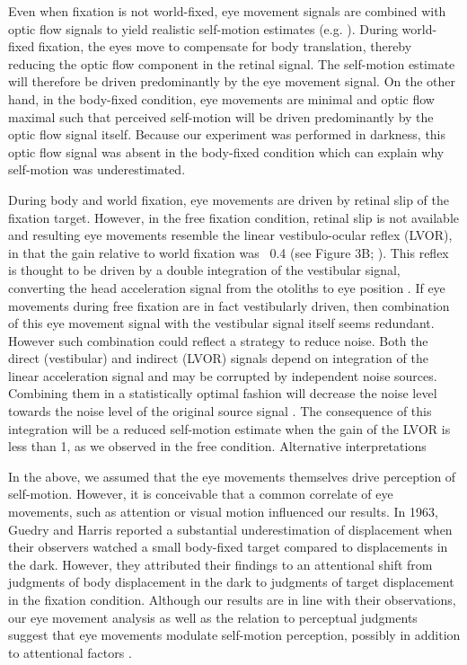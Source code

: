 Even when fixation is not world-fixed, eye movement signals are combined with optic flow signals to yield realistic self-motion estimates (e.g. \cite{royden1992,vandenberg2000}). During world-fixed fixation, the eyes move to compensate for body translation, thereby reducing the optic flow component in the retinal signal. The self-motion estimate will therefore be driven predominantly by the eye movement signal. On the other hand, in the body-fixed condition, eye movements are minimal and optic flow maximal such that perceived self-motion will be driven predominantly by the optic flow signal itself. Because our experiment was performed in darkness, this optic flow signal was absent in the body-fixed condition which can explain why self-motion was underestimated.

During body and world fixation, eye movements are driven by retinal slip of the fixation target. However, in the free fixation condition, retinal slip is not available and resulting eye movements resemble the linear vestibulo-ocular reflex (LVOR), in that the gain relative to world fixation was ~0.4 (see Figure 3B; \cite{ramat2003}). This reflex is thought to be driven by a double integration of the vestibular signal, converting the head acceleration signal from the otoliths to eye position \cite{green2007,walker2010}. If eye movements during free fixation are in fact vestibularly driven, then combination of this eye movement signal with the vestibular signal itself seems redundant. However such combination could reflect a strategy to reduce noise. Both the direct (vestibular) and indirect (LVOR) signals depend on integration of the linear acceleration signal and may be corrupted by independent noise sources. Combining them in a statistically optimal fashion will decrease the noise level towards the noise level of the original source signal \cite{faisal2008,clemens2011,fetsch2013}. The consequence of this integration will be a reduced self-motion estimate when the gain of the LVOR is less than 1, as we observed in the free condition.
Alternative interpretations

In the above, we assumed that the eye movements themselves drive perception of self-motion. However, it is conceivable that a common correlate of eye movements, such as attention or visual motion influenced our results. In 1963, Guedry and Harris reported a substantial underestimation of displacement when their observers watched a small body-fixed target compared to displacements in the dark. However, they attributed their findings to an attentional shift from judgments of body displacement in the dark to judgments of target displacement in the fixation condition. Although our results are in line with their observations, our eye movement analysis as well as the relation to perceptual judgments suggest that eye movements modulate self-motion perception, possibly in addition to attentional factors \cite{kitazaki2003}.

